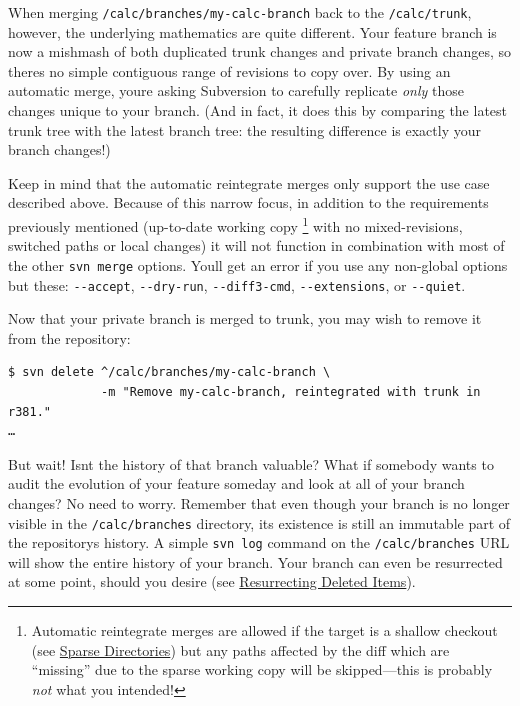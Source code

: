 When merging \texttt{/calc/branches/my-calc-branch} back to the
\texttt{/calc/trunk}, however, the underlying mathematics are quite
different. Your feature branch is now a mishmash of both duplicated
trunk changes and private branch changes, so there\textquotesingle s no
simple contiguous range of revisions to copy over. By using an automatic
merge, you\textquotesingle re asking Subversion to carefully replicate
\emph{only} those changes unique to your branch. (And in fact, it does
this by comparing the latest trunk tree with the latest branch tree: the
resulting difference is exactly your branch changes!)

Keep in mind that the automatic reintegrate merges only support the use
case described above. Because of this narrow focus, in addition to the
requirements previously mentioned (up-to-date working copy \footnote{Automatic
  reintegrate merges are allowed if the target is a shallow checkout
  (see \hyperref[svn.advanced.sparsedirs]{Sparse Directories}) but any
  paths affected by the diff which are ``missing'' due to the sparse
  working copy will be skipped---this is probably \emph{not} what you
  intended!} with no mixed-revisions, switched paths or local changes)
it will not function in combination with most of the other
\texttt{svn\ merge} options. You\textquotesingle ll get an error if you
use any non-global options but these: \texttt{-\/-accept},
\texttt{-\/-dry-run}, \texttt{-\/-diff3-cmd}, \texttt{-\/-extensions},
or \texttt{-\/-quiet}.

Now that your private branch is merged to trunk, you may wish to remove
it from the repository:

\begin{verbatim}
$ svn delete ^/calc/branches/my-calc-branch \
             -m "Remove my-calc-branch, reintegrated with trunk in r381."
…
\end{verbatim}

But wait! Isn\textquotesingle t the history of that branch valuable?
What if somebody wants to audit the evolution of your feature someday
and look at all of your branch changes? No need to worry. Remember that
even though your branch is no longer visible in the
\texttt{/calc/branches} directory, its existence is still an immutable
part of the repository\textquotesingle s history. A simple
\texttt{svn\ log} command on the \texttt{/calc/branches} URL will show
the entire history of your branch. Your branch can even be resurrected
at some point, should you desire (see
\hyperref[svn.branchmerge.basicmerging.resurrect]{Resurrecting Deleted
Items}).

